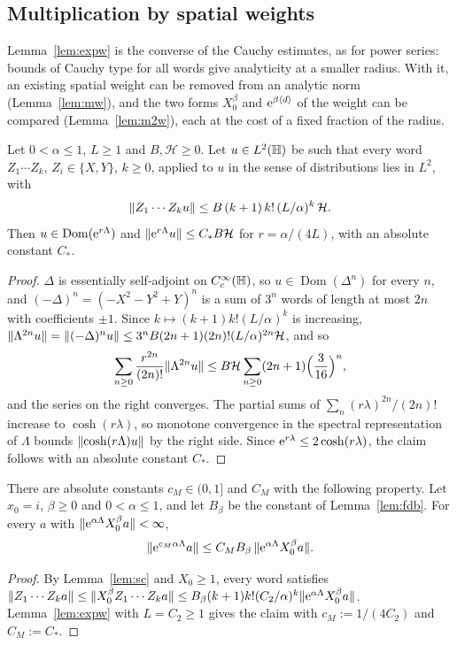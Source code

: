 \subsection{Multiplication by spatial weights}\label{app:m}
Lemma~\ref{lem:expw} is the converse of the Cauchy estimates, as for power series: bounds of Cauchy type for all words give
analyticity at a smaller radius. With it, an existing spatial weight can be removed from an analytic norm (Lemma~\ref{lem:mw}),
and the two forms $X_0^\beta$ and $\mathrm{e}^{\beta\langle d\rangle}$ of the weight can be compared (Lemma~\ref{lem:m2w}), each at the cost
of a fixed fraction of the radius.

\begin{lemma}\label{lem:expw}
Let $0<\alpha\le1$, $L\ge1$ and $B,\mathcal H\ge0$. Let $u\in L^2(\mathbb{H})$ be such that every word $Z_1\cdots Z_k$, $Z_i\in\{X,Y\}$, $k\ge0$,
applied to $u$ in the sense of distributions lies in $L^2$, with
\[
\lVert Z_1\cdots Z_ku\rVert\le B\,(k+1)\,k!\,(L/\alpha)^k\,\mathcal H .
\]
Then $u\in\operatorname{Dom}(\mathrm{e}^{r\Lambda})$ and $\lVert \mathrm{e}^{r\Lambda}u\rVert\le C_*B\mathcal H$ for $r=\alpha/(4L)$, with an absolute constant $C_*$.
\end{lemma}
\begin{proof}
$\Delta$ is essentially self-adjoint on $C_c^\infty(\mathbb{H})$, so $u\in\operatorname{Dom}(\Delta^n)$ for every $n$, and
$(-\Delta)^n=(-X^2-Y^2+Y)^n$ is a sum of $3^n$ words of length at most $2n$ with coefficients $\pm1$. Since
$k\mapsto(k+1)k!(L/\alpha)^k$ is increasing,
$\lVert \Lambda^{2n}u\rVert=\lVert (-\Delta)^nu\rVert\le3^nB(2n+1)(2n)!(L/\alpha)^{2n}\mathcal H$, and so
\[
\sum_{n\ge0}\frac{r^{2n}}{(2n)!}\lVert \Lambda^{2n}u\rVert\le B\mathcal H\sum_{n\ge0}(2n+1)\Bigl(\frac{3}{16}\Bigr)^n,
\]
and the series on the right converges.
The partial sums of $\sum_n(r\lambda)^{2n}/(2n)!$ increase to $\cosh(r\lambda)$, so monotone convergence in the spectral representation
of $\Lambda$ bounds $\lVert \cosh(r\Lambda)u\rVert$ by the right side. Since $\mathrm{e}^{r\lambda}\le2\cosh(r\lambda)$, the claim follows with an
absolute constant $C_*$.
\end{proof}

\begin{lemma}\label{lem:mw}
There are absolute constants $c_M\in(0,1]$ and $C_M$ with the following property. Let $x_0=i$, $\beta\ge0$ and $0<\alpha\le1$, and let
$B_\beta$ be the constant of Lemma~\ref{lem:fdb}. For every $a$ with $\lVert \mathrm{e}^{\alpha\Lambda}X_0^\beta a\rVert<\infty$,
\[
\lVert \mathrm{e}^{c_M\alpha\Lambda}a\rVert\le C_MB_\beta\,\lVert \mathrm{e}^{\alpha\Lambda}X_0^\beta a\rVert.
\]
\end{lemma}
\begin{proof}
By Lemma~\ref{lem:sc} and $X_0\ge1$, every word satisfies
$\lVert Z_1\cdots Z_ka\rVert\le\lVert X_0^\beta Z_1\cdots Z_ka\rVert\le B_\beta(k+1)k!(C_2/\alpha)^k\lVert \mathrm{e}^{\alpha\Lambda}X_0^\beta a\rVert$.
Lemma~\ref{lem:expw} with $L=C_2\ge1$ gives the claim with $c_M:=1/(4C_2)$ and $C_M:=C_*$.
\end{proof}

